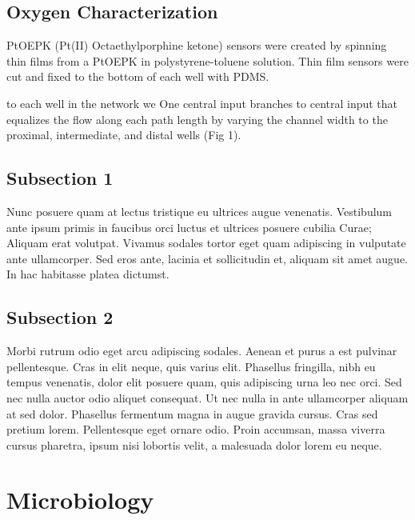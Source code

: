 \subsection{Oxygen Characterization}
PtOEPK (Pt(II) Octaethylporphine ketone) sensors were created by spinning thin films from a PtOEPK in polystyrene-toluene solution.
Thin film sensors were cut and fixed to the bottom of each well with PDMS.


 to each well in the network we
One central input branches to central input that equalizes the flow along each path length by varying the channel width to the proximal, intermediate, and distal wells (Fig 1). 

\subsection{Subsection 1}

Nunc posuere quam at lectus tristique eu ultrices augue venenatis. Vestibulum ante ipsum primis in faucibus orci luctus et ultrices posuere cubilia Curae; Aliquam erat volutpat. Vivamus sodales tortor eget quam adipiscing in vulputate ante ullamcorper. Sed eros ante, lacinia et sollicitudin et, aliquam sit amet augue. In hac habitasse platea dictumst.


\subsection{Subsection 2}
Morbi rutrum odio eget arcu adipiscing sodales. Aenean et purus a est pulvinar pellentesque. Cras in elit neque, quis varius elit. Phasellus fringilla, nibh eu tempus venenatis, dolor elit posuere quam, quis adipiscing urna leo nec orci. Sed nec nulla auctor odio aliquet consequat. Ut nec nulla in ante ullamcorper aliquam at sed dolor. Phasellus fermentum magna in augue gravida cursus. Cras sed pretium lorem. Pellentesque eget ornare odio. Proin accumsan, massa viverra cursus pharetra, ipsum nisi lobortis velit, a malesuada dolor lorem eu neque.


\section{Microbiology}

